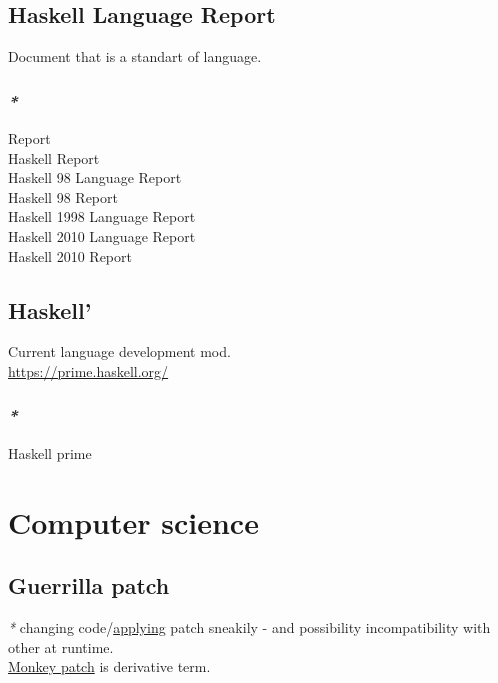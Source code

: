 \documentclass[a4paper,14pt,oneside]{book}
\begin{document}
\section{\label{orgd5ebda2}Haskell Language Report}
\label{sec:org79a9ccb}
Document that is a standart of language.\\

\subsection{\emph{*}}
\label{sec:org822d4d7}
\label{org14da792}Report\\
\label{orgca14476}Haskell Report\\
\label{orgcb39984}Haskell 98 Language Report\\
\label{org49b9115}Haskell 98 Report\\
\label{orgae113c4}Haskell 1998 Language Report\\
\label{org51fed26}Haskell 2010 Language Report\\
\label{org87bc72c}Haskell 2010 Report\\

\section{\label{orgf4845d7}Haskell'}
\label{sec:org5f9e88b}
Current language development mod.\\

\url{https://prime.haskell.org/}\\

\subsection{\emph{*}}
\label{sec:org1443ccc}

\label{org9177361}Haskell prime\\

\chapter{Computer science}
\label{sec:org6a8437e}
\section{\label{orgb67a388}Guerrilla patch}
\label{sec:org5876ed8}
\emph{*} changing code/\hyperref[org580eafc]{applying} patch sneakily - and possibility incompatibility with other at runtime.\\
\hyperref[org62ef61a]{Monkey patch} is derivative term.\\
\end{document}
